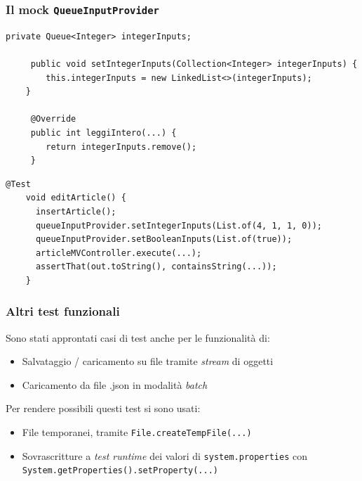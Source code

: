 \begin{frame} [fragile]
    \frametitle{Il mock \texttt{QueueInputProvider}}
    \begin{lstlisting}[autogobble, title={\texttt{QueueInputProvider.java}}]
     private Queue<Integer> integerInputs;

     public void setIntegerInputs(Collection<Integer> integerInputs) {
        this.integerInputs = new LinkedList<>(integerInputs);
    }

     @Override
     public int leggiIntero(...) {
        return integerInputs.remove();
     }
    \end{lstlisting}
    \begin{lstlisting}[autogobble, title={\texttt{ArticleMVControllerTest.java}}]
    @Test
    void editArticle() {
      insertArticle();
      queueInputProvider.setIntegerInputs(List.of(4, 1, 1, 0));
      queueInputProvider.setBooleanInputs(List.of(true));
      articleMVController.execute(...);
      assertThat(out.toString(), containsString(...));
    }
    \end{lstlisting}
\end{frame}

\begin{frame}
    \frametitle{Altri test funzionali}
    Sono stati approntati casi di test anche per le funzionalità di:
    \begin{itemize}
        \item Salvataggio / caricamento su file tramite \emph{stream} di oggetti
        \item Caricamento da file .json in modalità \emph{batch}
    \end{itemize}
    Per rendere possibili questi test si sono usati:
    \begin{itemize}
        \item File temporanei, tramite \texttt{File.createTempFile(...)}
        \item Sovrascritture a \emph{test runtime} dei valori di \texttt{system.properties} con \texttt{System.getProperties().setProperty(...)}
    \end{itemize}
\end{frame}